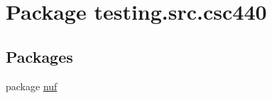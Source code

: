 \hypertarget{namespacetesting_1_1src_1_1csc440}{\section{Package testing.\-src.\-csc440}
\label{namespacetesting_1_1src_1_1csc440}
}
\subsection*{Packages}
\begin{DoxyCompactItemize}
\item 
package \hyperlink{namespacetesting_1_1src_1_1csc440_1_1nuf}{nuf}
\end{DoxyCompactItemize}
